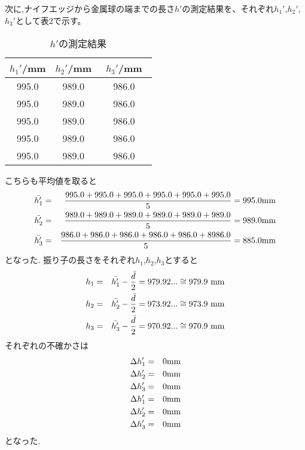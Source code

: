 \documentclass[a4j,10pt]{jarticle}
\begin{document}
  次に,ナイフエッジから金属球の端までの長さ$h'$の測定結果を、それぞれ$h_1'$,$h_2'$,$h_3'$として表2で示す。
  \begin{table}[h]
    \centering
    \caption{$h'$の測定結果}
    \begin{tabular}{c c c} \hline
        $h_1'$/mm & $h_2'$/mm & $h_3'$/mm　\\ \hline
        995.0 & 989.0 & 986.0 \\
        995.0 & 989.0 & 986.0 \\
        995.0 & 989.0 & 986.0 \\
        995.0 & 989.0 & 986.0 \\
        995.0 & 989.0 & 986.0 \\ \hline
    \end{tabular}
  \end{table}
  こちらも平均値を取ると
  \begin{eqnarray*}
    \bar{h_1'} &=& \frac{995.0+995.0+995.0+995.0+995.0+995.0}{5} =  995.0 {\rm mm} \\
    \bar{h_2'} &=& \frac{989.0+989.0+989.0+989.0+989.0+989.0}{5} = 989.0 {\rm mm} \\
    \bar{h_3'} &=& \frac{986.0+986.0+986.0+986.0+986.0+8986.0}{5} = 885.0 {\rm mm} \\
  \end{eqnarray*}
  となった.
  振り子の長さをそれぞれ$h_1$,$h_2$,$h_3$とすると
  \begin{eqnarray*}
    h_1 &=& \bar{h_1'}-\frac{\bar{d}}{2} = 979.92... \cong 979.9\ {\rm mm} \\
    h_2 &=& \bar{h_2'}-\frac{\bar{d}}{2} = 973.92... \cong 973.9\ {\rm mm} \\
    h_3 &=& \bar{h_3'}-\frac{\bar{d}}{2} = 970.92... \cong 970.9\ {\rm mm} \\
\end{eqnarray*}
  それぞれの不確かさは
  \begin{eqnarray*}
  \Delta h_1' &=& 0 {\rm mm} \\
  \Delta h_2' &=& 0 {\rm mm} \\
  \Delta h_3' &=& 0 {\rm mm} \\
  \Delta h_1' &=& 0 {\rm mm} \\
  \Delta h_2' &=& 0 {\rm mm} \\
  \Delta h_3' &=& 0 {\rm mm} \\
  \end{eqnarray*}
  となった.
\end{document}
